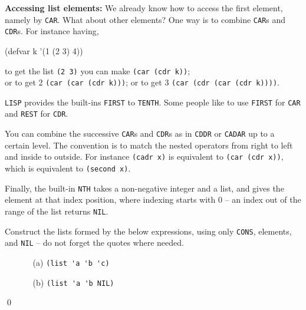 \documentclass[a4paper,11pt]{article}
\begin{document}
\begin{uenum}
\item {\bf Accessing list elements:} We already know how to access the first element, namely by \Verb+CAR+. What about other elements? One way is to combine \Verb+CAR+s and \Verb+CDR+s. For instance having,

\begin{lispcode}
(defvar k '(1 (2 3) 4))
\end{lispcode}

to get the list \Verb+(2 3)+ you can make \Verb+(car (cdr k))+;\\ or to get 2 \Verb+(car (car (cdr k)))+; or to get 3 \Verb+(car (cdr (car (cdr k))))+.

\Verb+LISP+ provides the built-ins \Verb+FIRST+ to \Verb+TENTH+. Some people like to use \Verb+FIRST+ for \Verb+CAR+ and \Verb+REST+ for \Verb+CDR+.

You can combine the successive \Verb+CAR+s and \Verb+CDR+s as in \Verb+CDDR+ or \Verb+CADAR+ up to a certain level. The convention is to match the nested operators from right to left and inside to outside. For instance \Verb+(cadr x)+ is equivalent to \Verb+(car (cdr x))+, which is equivalent to \Verb+(second x)+.

Finally, the built-in \Verb+NTH+ takes a non-negative integer and a list, and gives the element at that index position, where indexing starts with 0 -- an index out of the range of the list returns \Verb+NIL+. 

\end{uenum}


\noindent\hrulefill

\begin{uexercise}

Construct the lists formed by the below expressions, using only \Verb+CONS+, elements, and \Verb+NIL+ -- do not forget the quotes where needed.
\begin{enumerate}
	\item[]
\begin{itemize}
	\item[(a)] \Verb+(list 'a 'b 'c)+ 
	\item[(b)] \Verb+(list 'a 'b NIL)+ 
\end{itemize}
\end{enumerate}
\qed
\end{uexercise}
\end{document}
